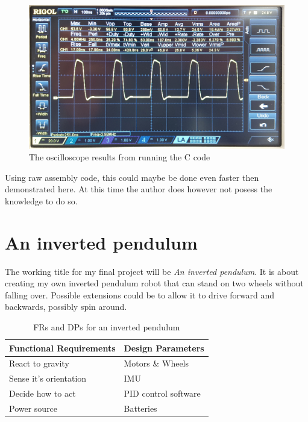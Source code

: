 \documentclass[11pt,a4paper,titlepage]{article}
\begin{document}
\begin{figure}[h]
		\centering
		\includegraphics[width=\textwidth]{graphics/eclipse_edit}
		\caption{The oscilloscope results from running the C code}
		\label{fig:eclipse}
\end{figure}

Using raw assembly code, this could maybe be done even faster then demonstrated here. At this time the author does however not posess the knowledge to do so.

\pagebreak

\section{An inverted pendulum}

The working title for my final project will be \textit{An inverted pendulum}. It is about creating my own inverted pendulum robot that can stand on two wheels without falling over. Possible extensions could be to allow it to drive forward and backwards, possibly spin around.

\begin{table}[h]
		\centering
		\begin{tabular}{ll}
			\toprule
			Functional Requirements		&		Design Parameters\\
			\midrule
			React to gravity	&	Motors \& Wheels\\
			Sense it's orientation	&	IMU\\
			Decide how to act	&	PID control software\\
			Power source	&	Batteries\\
			\bottomrule
		\end{tabular}
		\caption{FRs and DPs for an inverted pendulum}
		\label{tab:FRDP}
\end{table}
\end{document}
